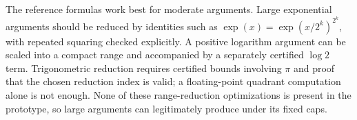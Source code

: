 The reference formulas work best for moderate arguments. Large exponential arguments should be reduced by identities such as \(\exp(x)=\exp(x/2^k)^{2^k}\), with repeated squaring checked explicitly. A positive logarithm argument can be scaled into a compact range and accompanied by a separately certified \(\log 2\) term. Trigonometric reduction requires certified bounds involving \(\pi\) and proof that the chosen reduction index is valid; a floating-point quadrant computation alone is not enough. None of these range-reduction optimizations is present in the prototype, so large arguments can legitimately produce \unknown{} under its fixed caps.
